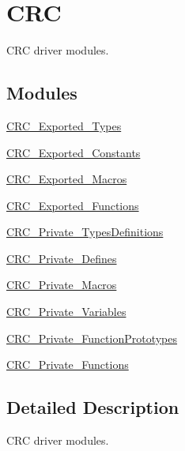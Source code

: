 \hypertarget{group___c_r_c}{}\section{C\+RC}
\label{group___c_r_c}


C\+RC driver modules.  


\subsection*{Modules}
\begin{DoxyCompactItemize}
\item 
\hyperlink{group___c_r_c___exported___types}{C\+R\+C\+\_\+\+Exported\+\_\+\+Types}
\item 
\hyperlink{group___c_r_c___exported___constants}{C\+R\+C\+\_\+\+Exported\+\_\+\+Constants}
\item 
\hyperlink{group___c_r_c___exported___macros}{C\+R\+C\+\_\+\+Exported\+\_\+\+Macros}
\item 
\hyperlink{group___c_r_c___exported___functions}{C\+R\+C\+\_\+\+Exported\+\_\+\+Functions}
\item 
\hyperlink{group___c_r_c___private___types_definitions}{C\+R\+C\+\_\+\+Private\+\_\+\+Types\+Definitions}
\item 
\hyperlink{group___c_r_c___private___defines}{C\+R\+C\+\_\+\+Private\+\_\+\+Defines}
\item 
\hyperlink{group___c_r_c___private___macros}{C\+R\+C\+\_\+\+Private\+\_\+\+Macros}
\item 
\hyperlink{group___c_r_c___private___variables}{C\+R\+C\+\_\+\+Private\+\_\+\+Variables}
\item 
\hyperlink{group___c_r_c___private___function_prototypes}{C\+R\+C\+\_\+\+Private\+\_\+\+Function\+Prototypes}
\item 
\hyperlink{group___c_r_c___private___functions}{C\+R\+C\+\_\+\+Private\+\_\+\+Functions}
\end{DoxyCompactItemize}


\subsection{Detailed Description}
C\+RC driver modules. 

